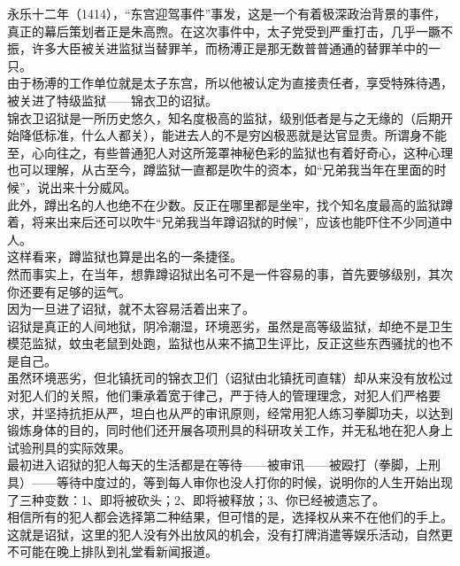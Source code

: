 \begin{multicols}{\theparacolNo}
永乐十二年（1414），“东宫迎驾事件”事发，这是一个有着极深政治背景的事件，真正的幕后策划者正是朱高煦。在这次事件中，太子党受到严重打击，几乎一蹶不振，许多大臣被关进监狱当替罪羊，而杨溥正是那无数普普通通的替罪羊中的一只。\\

由于杨溥的工作单位就是太子东宫，所以他被认定为直接责任者，享受特殊待遇，被关进了特级监狱——锦衣卫的诏狱。\\

锦衣卫诏狱是一所历史悠久，知名度极高的监狱，级别低者是与之无缘的（后期开始降低标准，什么人都关），能进去人的不是穷凶极恶就是达官显贵。所谓身不能至，心向往之，有些普通犯人对这所笼罩神秘色彩的监狱也有着好奇心，这种心理也可以理解，从古至今，蹲监狱一直都是吹牛的资本，如“兄弟我当年在里面的时候”，说出来十分威风。\\

此外，蹲出名的人也绝不在少数。反正在哪里都是坐牢，找个知名度最高的监狱蹲着，将来出来后还可以吹牛“兄弟我当年蹲诏狱的时候”，应该也能吓住不少同道中人。\\

这样看来，蹲监狱也算是出名的一条捷径。\\

然而事实上，在当年，想靠蹲诏狱出名可不是一件容易的事，首先要够级别，其次你还要有足够的运气。\\

因为一旦进了诏狱，就不太容易活着出来了。\\

诏狱是真正的人间地狱，阴冷潮湿，环境恶劣，虽然是高等级监狱，却绝不是卫生模范监狱，蚊虫老鼠到处跑，监狱也从来不搞卫生评比，反正这些东西骚扰的也不是自己。\\

虽然环境恶劣，但北镇抚司的锦衣卫们（诏狱由北镇抚司直辖）却从来没有放松过对犯人们的关照，他们秉承着宽于律己，严于待人的管理理念，对犯人们严格要求，并坚持抗拒从严，坦白也从严的审讯原则，经常用犯人练习拳脚功夫，以达到锻炼身体的目的，同时他们还开展各项刑具的科研攻关工作，并无私地在犯人身上试验刑具的实际效果。\\

最初进入诏狱的犯人每天的生活都是在等待——被审讯——被殴打（拳脚，上刑具）——等待中度过的，等到每人审你也没人打你的时候，说明你的人生开始出现了三种变数：1、即将被砍头；2、即将被释放；3、你已经被遗忘了。\\

相信所有的犯人都会选择第二种结果，但可惜的是，选择权从来不在他们的手上。\\

这就是诏狱，这里的犯人没有外出放风的机会，没有打牌消遣等娱乐活动，自然更不可能在晚上排队到礼堂看新闻报道。\\


\end{multicols}
